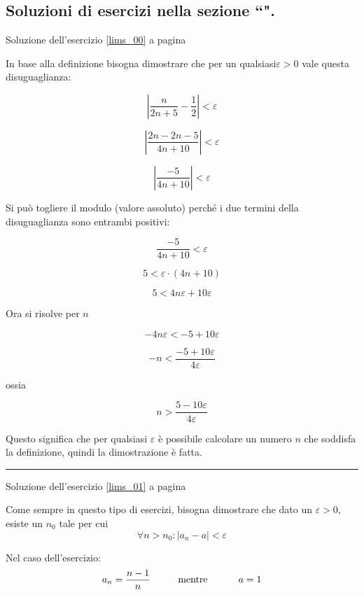 

\subsection{Soluzioni di esercizi nella sezione ``\textbf{}".}

Soluzione dell'esercizio \ref{lims_00} a pagina \pageref{lims_00}\label{limss_00}

In base alla definizione bisogna dimostrare che per un qualsiasi$\varepsilon > 0$
vale questa disuguaglianza: 

\[
\left|
\frac{
n
}{
2n+5
}-\frac{1}{2}
\right|
<\varepsilon
\]


\[
\left|
\frac{
2n -2n -5
}{
4n+10
}
\right|
<\varepsilon
\]


\[
\left|
\frac{
-5
}{
4n+10
}
\right|
<\varepsilon
\]

Si può togliere il modulo (valore assoluto) perché i due termini della disuguaglianza sono entrambi positivi:


\[
\frac{
-5
}{
4n+10
}
<\varepsilon
\]


\[
5
<\varepsilon
\cdot(4n+10)
\]



\[
5
<4n\varepsilon+10\varepsilon
\]

Ora si risolve per $n$

\[
-4n\varepsilon
<
-5
+10\varepsilon
\]


\[
-n
<
\frac{
-5
+10\varepsilon
}{4\varepsilon}
\]

ossia 

\[
n
>
\frac{
5
-10\varepsilon
}{4\varepsilon}
\]

Questo significa che per qualsiasi $\varepsilon$ è possibile calcolare un numero $n$ che soddisfa la definizione, quindi la dimostrazione è fatta.

\vspace{1cm}
\hrule
\vspace{1cm}



Soluzione dell'esercizio \ref{lims_01} a pagina \pageref{lims_01}\label{limss_01}

Come sempre in questo tipo di esercizi, bisogna dimostrare che dato un $\varepsilon > 0$, esiste un $n_0$ tale per cui
\[
\forall n>n_0: \left| a_n - a \right| < \varepsilon
\]

Nel caso dell'esercizio:
\[
a_n = \frac{n-1}{n} \textrm{\hspace{1cm}mentre \hspace{1cm}} a=1
\]

